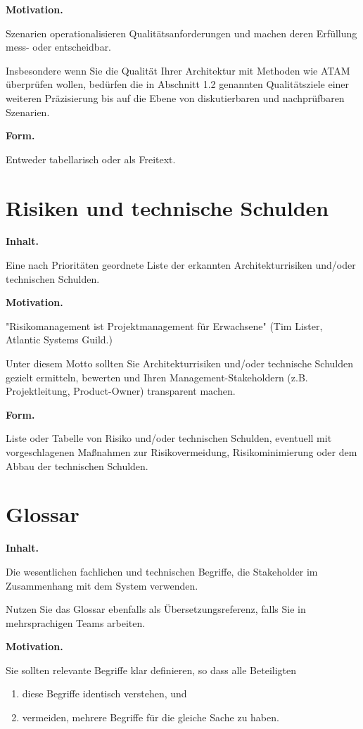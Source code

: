 \documentclass[]{article}
\begin{document}
\textbf{Motivation.}

Szenarien operationalisieren Qualitätsanforderungen und machen deren
Erfüllung mess- oder entscheidbar.

Insbesondere wenn Sie die Qualität Ihrer Architektur mit Methoden wie
ATAM überprüfen wollen, bedürfen die in Abschnitt 1.2 genannten
Qualitätsziele einer weiteren Präzisierung bis auf die Ebene von
diskutierbaren und nachprüfbaren Szenarien.

\textbf{Form.}

Entweder tabellarisch oder als Freitext.

\section{Risiken und technische Schulden}\label{section-technical-risks}

\textbf{Inhalt.}

Eine nach Prioritäten geordnete Liste der erkannten Architekturrisiken
und/oder technischen Schulden.

\textbf{Motivation.}

"Risikomanagement ist Projektmanagement für Erwachsene" (Tim Lister,
Atlantic Systems Guild.)

Unter diesem Motto sollten Sie Architekturrisiken und/oder technische
Schulden gezielt ermitteln, bewerten und Ihren Management-Stakeholdern
(z.B. Projektleitung, Product-Owner) transparent machen.

\textbf{Form.}

Liste oder Tabelle von Risiko und/oder technischen Schulden, eventuell
mit vorgeschlagenen Maßnahmen zur Risikovermeidung, Risikominimierung
oder dem Abbau der technischen Schulden.

\section{Glossar}\label{section-glossary}

\textbf{Inhalt.}

Die wesentlichen fachlichen und technischen Begriffe, die Stakeholder im
Zusammenhang mit dem System verwenden.

Nutzen Sie das Glossar ebenfalls als Übersetzungsreferenz, falls Sie in
mehrsprachigen Teams arbeiten.

\textbf{Motivation.}

Sie sollten relevante Begriffe klar definieren, so dass alle Beteiligten

\begin{enumerate}
\def\labelenumi{\arabic{enumi}.}
\item
  diese Begriffe identisch verstehen, und
\item
  vermeiden, mehrere Begriffe für die gleiche Sache zu haben.
\end{enumerate}
\end{document}
